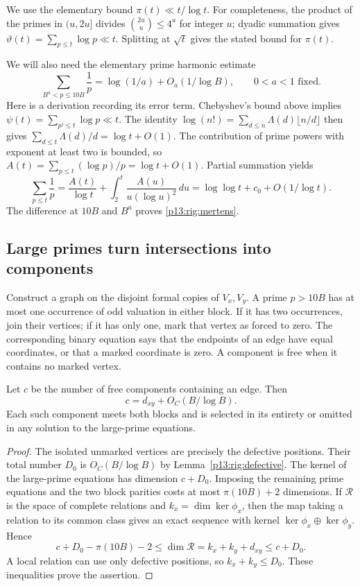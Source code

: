 We use the elementary bound $\pi(t)\ll t/\log t$.  For
completeness, the product of the primes in $(u,2u]$ divides
$\binom{2u}{u}\le4^u$ for integer $u$; dyadic summation gives
$\vartheta(t)=\sum_{p\le t}\log p\ll t$.  Splitting at
$\sqrt t$ gives the stated bound for $\pi(t)$.

We will also need the elementary prime harmonic estimate
\begin{equation}
 \sum_{B^a<p\le10B}\frac1p
       =\log(1/a)+O_a(1/\log B),\qquad 0<a<1\text{ fixed}.
 \label{p13:rig:mertens}
\end{equation}
Here is a derivation recording its error term.  Chebyshev's bound
above implies $\psi(t)=\sum_{p^j\le t}\log p\ll t$.
The identity
$\log(n!)=\sum_{d\le n}\Lambda(d)\lfloor n/d\rfloor$
then gives $\sum_{d\le t}\Lambda(d)/d=\log t+O(1)$.
The contribution of prime powers with exponent at least two is
bounded, so $A(t)=\sum_{p\le t}(\log p)/p=\log t+O(1)$.
Partial summation yields
\[
 \sum_{p\le t}\frac1p
 =\frac{A(t)}{\log t}+\int_2^t\frac{A(u)}{u(\log u)^2}\,du
 =\log\log t+c_0+O(1/\log t).
\]
The difference at $10B$ and $B^a$ proves
\eqref{p13:rig:mertens}.

\subsection{Large primes turn intersections into components}

Construct a graph on the disjoint formal copies of $V_x,V_y$.
A prime $p>10B$ has at most one occurrence of odd valuation
in either block.  If it has two occurrences, join their vertices;
if it has only one, mark that vertex as forced to zero.
The corresponding binary equation says that the endpoints of
an edge have equal coordinates, or that a marked coordinate is
zero.  A component is free when it contains no marked vertex.

\begin{lemma}
\label{p13:rig:components}
Let $c$ be the number of free components containing an edge.
Then
\[
                         c=d_{xy}+O_C(B/\log B).
\]
Each such component meets both blocks and is selected in its
entirety or omitted in any solution to the large-prime equations.
\end{lemma}

\begin{proof}
The isolated unmarked vertices are precisely the defective
positions.  Their total number $D_0$ is $O_C(B/\log B)$ by
Lemma~\ref{p13:rig:defective}.  The kernel of the large-prime
equations has dimension $c+D_0$.  Imposing the remaining
prime equations and the two block parities costs at most
$\pi(10B)+2$ dimensions.  If $\mathcal R$ is the space of
complete relations and $k_x=\dim\ker\phi_x$, then the map
taking a relation to its common class gives an exact sequence
with kernel $\ker\phi_x\oplus\ker\phi_y$.  Hence
\[
 c+D_0-\pi(10B)-2\le\dim\mathcal R=k_x+k_y+d_{xy}
                                      \le c+D_0.
\]
A local relation can use only defective positions, so
$k_x+k_y\le D_0$.  These inequalities prove the assertion.
\end{proof}


